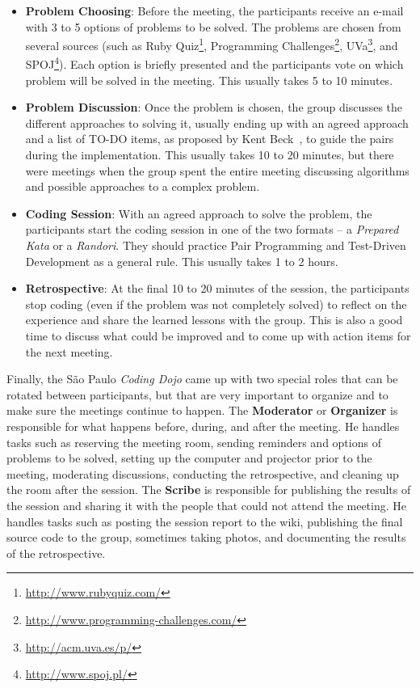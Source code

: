 \begin{itemize}
\item \textbf{Problem Choosing}: Before the meeting, the participants
  receive an e-mail with 3 to 5 options of problems to be solved. The
  problems are chosen from several sources (such as Ruby
  Quiz\footnote{\url{http://www.rubyquiz.com/}}, Programming
  Challenges\footnote{\url{http://www.programming-challenges.com/}},
  UVa\footnote{\url{http://acm.uva.es/p/}}, and
  SPOJ\footnote{\url{http://www.spoj.pl/}}). Each option is briefly
  presented and the participants vote on which problem will be solved
  in the meeting. This usually takes 5 to 10 minutes.
	
\item \textbf{Problem Discussion}: Once the problem is chosen, the
  group discusses the different approaches to solving it, usually
  ending up with an agreed approach and a list of TO-DO items, as
  proposed by Kent Beck~\cite{TDD}, to guide the pairs during the
  implementation. This usually takes 10 to 20 minutes, but there were
  meetings when the group spent the entire meeting discussing
  algorithms and possible approaches to a complex problem.
	
\item \textbf{Coding Session}: With an agreed approach to solve the
  problem, the participants start the coding session in one of the two
  formats -- a \emph{Prepared Kata} or a \emph{Randori}. They should
  practice Pair Programming and Test-Driven Development as a general
  rule. This usually takes 1 to 2 hours.

\item \textbf{Retrospective}: At the final 10 to 20 minutes of the
  session, the participants stop coding (even if the problem was not
  completely solved) to reflect on the experience and share the
  learned lessons with the group. This is also a good time to discuss
  what could be improved and to come up with action items for the next
  meeting.
\end{itemize}

Finally, the São Paulo \emph{Coding Dojo} came up with two special
roles that can be rotated between participants, but that are very
important to organize and to make sure the meetings continue to
happen. The \textbf{Moderator} or \textbf{Organizer} is responsible
for what happens before, during, and after the meeting. He handles
tasks such as reserving the meeting room, sending reminders and
options of problems to be solved, setting up the computer and
projector prior to the meeting, moderating discussions, conducting the
retrospective, and cleaning up the room after the session. The
\textbf{Scribe} is responsible for publishing the results of the
session and sharing it with the people that could not attend the
meeting. He handles tasks such as posting the session report to the
wiki, publishing the final source code to the group, sometimes taking
photos, and documenting the results of the retrospective.

